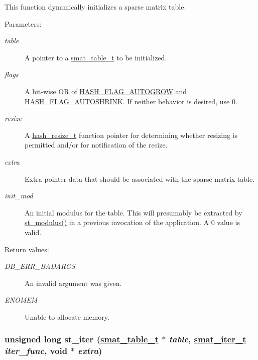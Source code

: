 This function dynamically initializes a sparse matrix table.\begin{Desc}
\item[Parameters: ]\par
\begin{description}
\item[{\em 
table}]A pointer to a \hyperlink{group__dbprim__smat_a0}{smat\_\-table\_\-t} to be initialized. \item[{\em 
flags}]A bit-wise OR of \hyperlink{group__dbprim__hash_a16}{HASH\_\-FLAG\_\-AUTOGROW} and \hyperlink{group__dbprim__hash_a17}{HASH\_\-FLAG\_\-AUTOSHRINK}. If neither behavior is desired, use 0. \item[{\em 
resize}]A \hyperlink{group__dbprim__hash_a5}{hash\_\-resize\_\-t} function pointer for determining whether resizing is permitted and/or for notification of the resize. \item[{\em 
extra}]Extra pointer data that should be associated with the sparse matrix table. \item[{\em 
init\_\-mod}]An initial modulus for the table. This will presumably be extracted by \hyperlink{group__dbprim__smat_a25}{st\_\-modulus()} in a previous invocation of the application. A 0 value is valid.\end{description}
\end{Desc}
\begin{Desc}
\item[Return values: ]\par
\begin{description}
\item[{\em 
DB\_\-ERR\_\-BADARGS}]An invalid argument was given. \item[{\em 
ENOMEM}]Unable to allocate memory. \end{description}
\end{Desc}
\hypertarget{group__dbprim__smat_a13}{
\subsubsection[st\_\-iter]{\setlength{\rightskip}{0pt plus 5cm}unsigned long st\_\-iter (\hyperlink{group__dbprim__smat_a0}{smat\_\-table\_\-t} $\ast$ {\em table}, \hyperlink{group__dbprim__smat_a4}{smat\_\-iter\_\-t} {\em iter\_\-func}, void $\ast$ {\em extra})}}
\label{group__dbprim__smat_a13}


